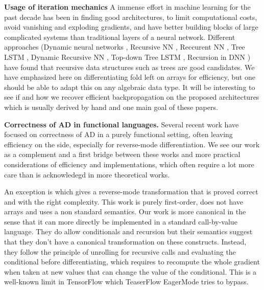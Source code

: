 \noindent \textbf{Usage of iteration mechanics}
A immense effort in machine learning for the past decade has been in finding
good architectures, to limit computational costs, 
avoid vanishing and exploding gradients, 
and have better building blocks of large complicated systems than traditional layers of a neural network.
Different approaches 
(Dynamic neural networks \cite{jin2017manipulability,wu2016deep}, 
Recursive NN \cite{socher2011parsing,biancofiore2017recursive}, 
Reccurent NN \cite{bahdanau2014neural,luong2015effective}, 
Tree LSTM \cite{tai2015improved,chen2016enhanced}, 
Dynamic Recursive NN \cite{guo2019dynamic}, 
Top-down Tree LSTM \cite{zhang2015top}, 
Recursion in DNN \cite{jeong2018improving}) 
have found that recursive data structures such as trees are good candidates.
We have emphasized here on differentiating fold left on arrays for efficiency, 
but one should be able to adapt this on any algebraic data type. 
It will be interesting to see if and how we recover efficient backpropagation on the proposed architectures 
which is usually derived by hand and one main goal of these papers.

\noindent \textbf{Correctness of AD in functional languages.}
Several recent work \cite{huot2020correctness,vakar2020reverse,vakar2020denotational,brunel2019backpropagation,barthe2020versatility,mazza2021automatic,ee2020correctness} have focused on correctness of AD in a purely functional setting, 
often leaving efficiency on the side, especially for reverse-mode differentiation. 
We see our work as a complement and a first bridge between these works 
and more practical considerations of efficiency and implementations, 
which often require a lot more care than is acknowledegd in more theoretical works.

An exception is \cite{abadi-plotkin2020} which gives a reverse-mode transformation that is proved correct and with the right complexity.
This work is purely first-order, does not have arrays and uses a non standard semantics. 
Our work is more canonical in the sense that it can more directly be implemented in a standard call-by-value language.
They do allow conditionals and recursion but their semantics suggest that they don't have a canonical transformation on these constructs. 
Instead, they follow the principle of unrolling for recursive calls and evaluating the conditional before differentiating, 
which requires to recompute the whole gradient when taken at new values that can change the value of the conditional. 
This is a well-known limit in TensorFlow \cite{abadi2016tensorflow} which TeaserFlow EagerMode \cite{agrawal2019tensorflow} tries to bypass. 

